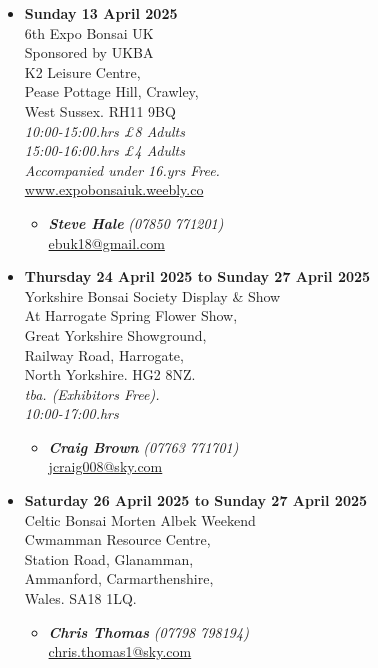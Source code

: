 \begin{itemize}
    \item \textbf{Sunday 13 April 2025}
    \\
    6th Expo Bonsai UK \\
    Sponsored by UKBA \\
    K2 Leisure Centre, \\
    Pease Pottage Hill, Crawley, \\
    West Sussex. RH11 9BQ
    \\
    \emph{10:00-15:00.hrs £8 Adults} \\
    \emph{15:00-16:00.hrs £4 Adults} \\
    \emph{Accompanied under 16.yrs Free.}
    \\
    \href{http://www.expobonsaiuk.weebly.co/}{www.expobonsaiuk.weebly.co}
    \begin{itemize}
        \item \textbf{\emph{Steve Hale}} \emph{(07850 771201)} \\
        \href{mailto:ebuk18@gmail.com}{ebuk18@gmail.com} 
    \end{itemize}

    \item \textbf{Thursday 24 April 2025 to Sunday 27 April 2025}
    \\
    Yorkshire Bonsai Society Display \& Show \\
    At Harrogate Spring Flower Show, \\
    Great Yorkshire Showground, \\
    Railway Road, Harrogate, \\
    North Yorkshire. HG2 8NZ.
    \\
    \emph{tba. (Exhibitors Free).} \\
    \emph{10:00-17:00.hrs}
    \begin{itemize}
        \item \textbf{\emph{Craig Brown}} \emph{(07763 771701)} \\
        \href{mailto:jcraig008@sky.com}{jcraig008@sky.com} 
    \end{itemize}

    \item \textbf{Saturday 26 April 2025 to Sunday 27 April 2025}
    \\
    Celtic Bonsai Morten Albek Weekend \\
    Cwmamman Resource Centre, \\
    Station Road, Glanamman, \\
    Ammanford, Carmarthenshire, \\
    Wales. SA18 1LQ.
    \begin{itemize}
        \item \textbf{\emph{Chris Thomas}} \emph{(07798 798194)} \\
        \href{mailto:chris.thomas1@sky.com}{chris.thomas1@sky.com} 
    \end{itemize}


\end{itemize}
